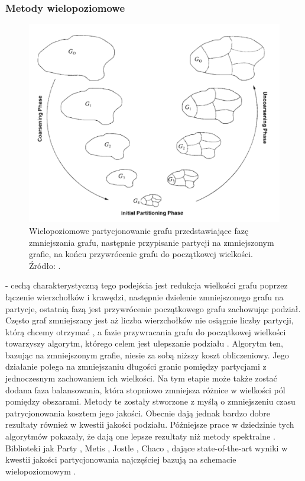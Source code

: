 \newpage

\subsubsection{Metody wielopoziomowe}

\begin{figure}[h]
    \centering
    \includegraphics[width=\linewidth]{images/coarsening}
    \caption{Wielopoziomowe partycjonowanie grafu przedstawiające fazę zmniejszania grafu, następnie przypisanie
    partycji na zmniejszonym grafie, na końcu przywrócenie grafu do początkowej wielkości.
    Źródło: \cite{KARYPIS199896}.}
    \label{im:multilevel_partitioning}
\end{figure}

\cite{metis, jostle, Bui1993AHF, 103500, 185177, 279334, inproceedings, 129970, 10.1145/165939.165942}
- cechą charakterystyczną tego podejścia jest redukcja
wielkości grafu poprzez łączenie wierzchołków i krawędzi, następnie dzielenie zmniejszonego grafu na partycje, ostatnią fazą
jest przywrócenie początkowego grafu zachowując podział. Często graf zmniejszany jest aż liczba wierzchołków nie osiągnie
liczby partycji, którą chcemy otrzymać \cite{1364754}, a fazie przywracania grafu do początkowej wielkości towarzyszy
algorytm, którego celem jest ulepszanie podziału \cite{article, 10.5555/800263.809204}. Algorytm ten, bazując na zmniejszonym
grafie, niesie za sobą niższy koszt obliczeniowy. Jego działanie polega na zmniejszaniu długości granic pomiędzy partycjami
z jednoczesnym zachowaniem ich wielkości. Na tym etapie może także zostać dodana faza balansowania, która stopniowo zmniejsza różnice
w wielkości pól pomiędzy obszarami. Metody te zostały stworzone z myślą o zmniejszeniu czasu
patrycjonowania kosztem jego jakości. Obecnie dają jednak bardzo dobre rezultaty również w kwestii jakości podziału.
Późniejsze prace w dziedzinie tych algorytmów pokazały, że dają one lepsze rezultaty niż metody spektralne \cite{metis}.
Biblioteki jak Party \cite{1364754}, Metis \cite{metis}, Jostle \cite{jostle}, Chaco \cite{inproceedings},
dające state-of-the-art wyniki w kwestii jakości partycjonowania najczęściej bazują na schemacie wielopoziomowym
\cite{inproceedings}.

